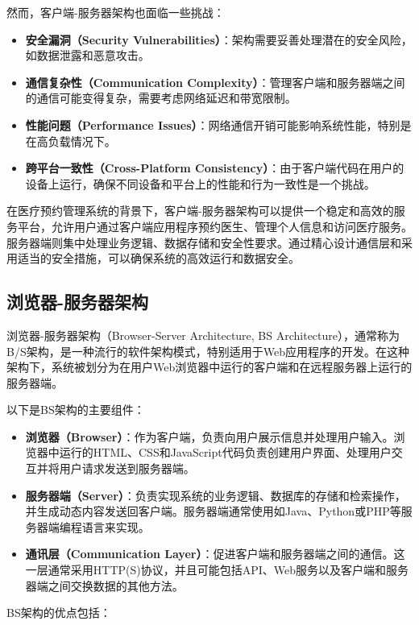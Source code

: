 然而，客户端-服务器架构也面临一些挑战：

\begin{itemize}
	\item \textbf{安全漏洞（Security Vulnerabilities）}：架构需要妥善处理潜在的安全风险，如数据泄露和恶意攻击。
	\item \textbf{通信复杂性（Communication Complexity）}：管理客户端和服务器端之间的通信可能变得复杂，需要考虑网络延迟和带宽限制。
	\item \textbf{性能问题（Performance Issues）}：网络通信开销可能影响系统性能，特别是在高负载情况下。
	\item \textbf{跨平台一致性（Cross-Platform Consistency）}：由于客户端代码在用户的设备上运行，确保不同设备和平台上的性能和行为一致性是一个挑战。
\end{itemize}

在医疗预约管理系统的背景下，客户端-服务器架构可以提供一个稳定和高效的服务平台，允许用户通过客户端应用程序预约医生、管理个人信息和访问医疗服务。服务器端则集中处理业务逻辑、数据存储和安全性要求。通过精心设计通信层和采用适当的安全措施，可以确保系统的高效运行和数据安全。


\subsection{浏览器-服务器架构}
浏览器-服务器架构（Browser-Server Architecture, BS Architecture），通常称为B/S架构，是一种流行的软件架构模式，特别适用于Web应用程序的开发。在这种架构下，系统被划分为在用户Web浏览器中运行的客户端和在远程服务器上运行的服务器端。

以下是BS架构的主要组件：

\begin{itemize}
	\item \textbf{浏览器（Browser）}：作为客户端，负责向用户展示信息并处理用户输入。浏览器中运行的HTML、CSS和JavaScript代码负责创建用户界面、处理用户交互并将用户请求发送到服务器端。
	
	\item \textbf{服务器端（Server）}：负责实现系统的业务逻辑、数据库的存储和检索操作，并生成动态内容发送回客户端。服务器端通常使用如Java、Python或PHP等服务器端编程语言来实现。
	
	\item \textbf{通讯层（Communication Layer）}：促进客户端和服务器端之间的通信。这一层通常采用HTTP(S)协议，并且可能包括API、Web服务以及客户端和服务器端之间交换数据的其他方法。
\end{itemize}

BS架构的优点包括：

